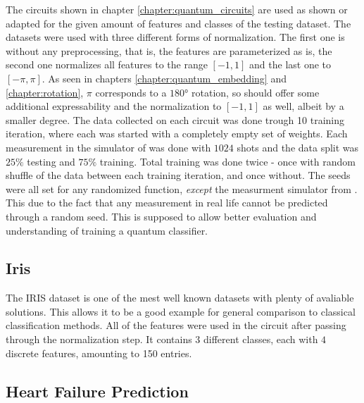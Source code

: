The circuits shown in chapter \ref{chapter:quantum_circuits} are used as shown or adapted for the given amount of features and classes of the testing dataset. The datasets were used with three different forms of normalization. The first one is without any preprocessing, that is, the features are parameterized as is, the second one normalizes all features to the range $[-1,1]$ and the last one to  $[-\pi,\pi]$. As seen in chapters \ref{chapter:quantum_embedding} and \ref{chapter:rotation}, $\pi$ corresponds to a $180°$ rotation, so should offer some additional expressability and the normalization to $[-1,1]$ as well, albeit by a smaller degree. The data collected on each circuit was done trough 10 training iteration, where each was started with a completely empty set of weights. Each measurement in the simulator of  was done with $1024$ shots and the data split was $25\%$ testing and $75\%$ training. Total training was done twice - once with random shuffle of the data between each training iteration, and once without. The seeds were all set for any randomized function, \emph{except} the measurment simulator from . This due to the fact that any measurement in real life cannot be predicted through a random seed. This is supposed to allow better evaluation and understanding of training a quantum classifier.


\subsection{Iris}
\label{chapter:iris}

The IRIS \cite{fisher_use_1936} dataset is one of the mest well known datasets with plenty of avaliable solutions. This allows it to be a good example for general comparison to classical classification methods. All of the features were used in the circuit after passing through the normalization step. It contains $3$ different classes, each with $4$ discrete features, amounting to 150 entries.

\subsection{Heart Failure Prediction}
\label{chapter:heart_failure_prediction}

